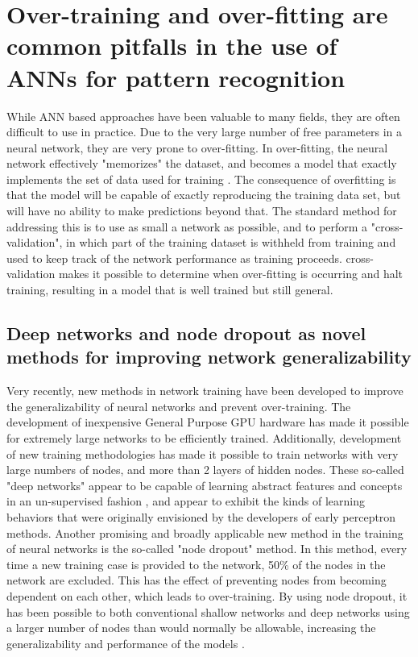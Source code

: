 \section{Over-training and over-fitting are common pitfalls in the use of \acs{ANN}s for pattern recognition}
\label{sec:intro_overtraining}
While \ac{ANN} based approaches have been valuable to many fields, they are often difficult to use in practice.
Due to the very large number of free parameters in a neural network, they are very prone to over-fitting.
In over-fitting, the neural network effectively "memorizes" the dataset, and becomes a model that exactly implements the set of data used for training \citep{Tetko:1995cm}.
The consequence of overfitting is that the model will be capable of exactly reproducing the training data set, but will have no ability to make predictions beyond that.
The standard method for addressing this is to use as small a network as possible, and to perform a "cross-validation", in which part of the training dataset is withheld from training and used to keep track of the network performance as training proceeds.
cross-validation makes it possible to determine when over-fitting is occurring and halt training, resulting in a model that is well trained but still general.

\subsection{Deep networks and node dropout as novel methods for improving network generalizability}
Very recently, new methods in network training have been developed to improve the generalizability of neural networks and prevent over-training.
The development of inexpensive General Purpose \ac{GPU} hardware has made it possible for extremely large networks to be efficiently trained.
Additionally, development of new training methodologies \citep{Hinton:2006dy} has made it possible to train networks with very large numbers of nodes, and more than 2 layers of hidden nodes.
These so-called "deep networks" appear to be capable of learning abstract features and concepts in an un-supervised fashion \citep{Le:2013kz}, and appear to exhibit the kinds of learning behaviors that were originally envisioned by the developers of early perceptron methods.
Another promising and broadly applicable new method in the training of neural networks is the so-called "node dropout" method.
In this method, every time a new training case is provided to the network, 50\% of the nodes in the network are excluded.
This has the effect of preventing nodes from becoming dependent on each other, which leads to over-training.
By using node dropout, it has been possible to both conventional shallow networks and deep networks using a larger number of nodes than would normally be allowable, increasing the generalizability and performance of the models \citep{Hinton:2012tv}.

